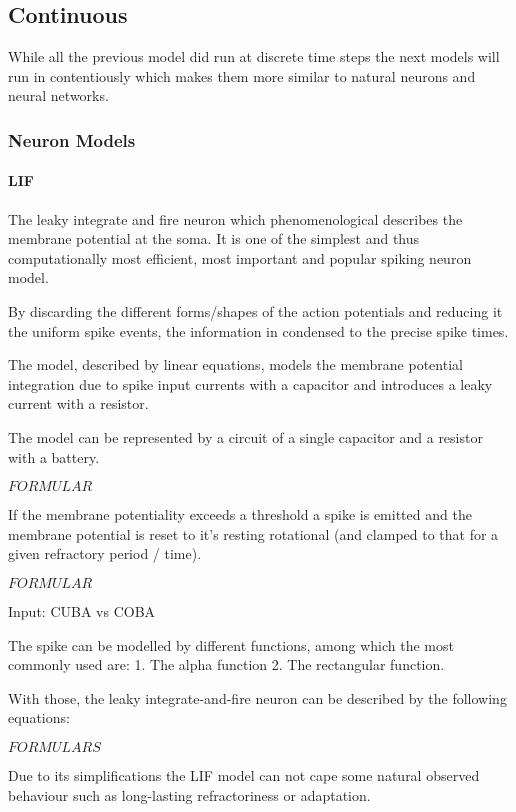\subsection{Continuous}

While all the previous model did run at discrete time steps the next models will run in contentiously which makes them more similar to natural neurons and neural networks. 

\subsubsection{Neuron Models}
\paragraph{LIF}

The leaky integrate and fire neuron which phenomenological describes the membrane potential at the soma. 
It is one of the simplest and thus computationally most efficient, most important and popular spiking neuron model.  

By discarding the different forms/shapes of the action potentials and reducing it the uniform spike events, the information in condensed to the precise spike times.

The model, described by linear equations, models the membrane potential integration due to spike input currents with a capacitor and introduces a leaky current with a resistor. 

The model can be represented by a circuit of a single capacitor and a resistor with a battery.

$FORMULAR$

If the membrane potentiality exceeds a threshold a spike is emitted and the membrane potential is reset to it's resting rotational (and clamped to that for a given refractory period / time).

$FORMULAR$ 

Input: CUBA vs COBA

The spike can be modelled by different functions, among which the most commonly used are: 
1. The alpha function
2. The rectangular function. 

With those, the leaky integrate-and-fire neuron can be described by the following equations:

$FORMULARS$


Due to its simplifications the LIF model can not cape some natural observed behaviour such as long-lasting refractoriness or adaptation. 

